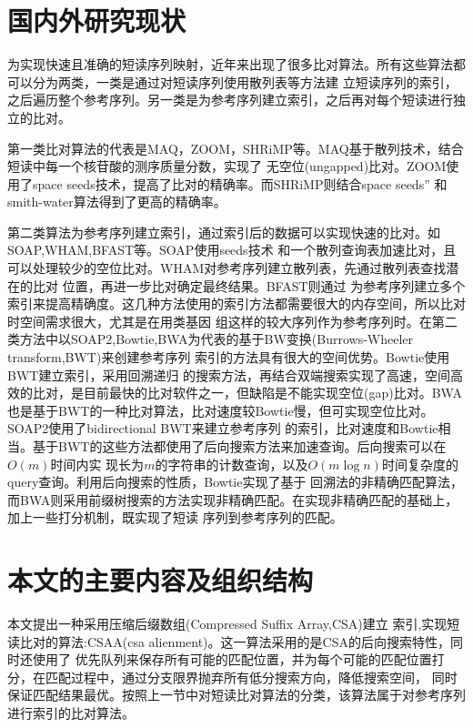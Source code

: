 \section{国内外研究现状}
为实现快速且准确的短读序列映射，近年来出现了很多比对算法。所有这些算法都可以分为两类，一类是通过对短读序列使用散列表等方法建
立短读序列的索引，之后遍历整个参考序列。另一类是为参考序列建立索引，之后再对每个短读进行独立的比对。

第一类比对算法的代表是MAQ，ZOOM，SHRiMP等。MAQ\cite{li2008mapping}基于散列技术，结合短读中每一个核苷酸的测序质量分数，实现了
无空位(ungapped)比对。ZOOM\cite{lin2008zoom}使用了space seeds技术，提高了比对的精确率。而SHRiMP\cite{rumble2009shrimp}则结合space seeds''
和smith-water算法得到了更高的精确率。

第二类算法为参考序列建立索引，通过索引后的数据可以实现快速的比对。如SOAP,WHAM,BFAST等。SOAP\cite{li2008soap}使用seeds技术
和一个散列查询表加速比对，且可以处理较少的空位比对。WHAM\cite{li2012wham}对参考序列建立散列表，先通过散列表查找潜在的比对
位置，再进一步比对确定最终结果。BFAST\cite{homer2009bfast}则通过
为参考序列建立多个索引来提高精确度。这几种方法使用的索引方法都需要很大的内存空间，所以比对时空间需求很大，尤其是在用类基因
组这样的较大序列作为参考序列时。在第二类方法中以SOAP2,Bowtie,BWA为代表的基于BW变换(Burrows-Wheeler transform,BWT)\cite{ferragina2005indexing}来创建参考序列
索引的方法具有很大的空间优势。Bowtie\cite{langmead2009ultrafast}使用BWT建立索引，采用回溯递归
的搜索方法，再结合双端搜索实现了高速，空间高效的比对，是目前最快的比对软件之一，但缺陷是不能实现空位(gap)比对。BWA\cite{li2009fast}
也是基于BWT的一种比对算法，比对速度较Bowtie慢，但可实现空位比对。SOAP2\cite{li2009soap2}使用了bidirectional BWT来建立参考序列
的索引，比对速度和Bowtie相当。基于BWT的这些方法都使用了后向搜索方法\cite{lippert2005space}来加速查询。后向搜索可以在$O(m)$时间内实
现长为$m$的字符串的计数查询，以及$O(m\log n)$时间复杂度的query查询。利用后向搜索的性质，Bowtie实现了基于
回溯法的非精确匹配算法，而BWA则采用前缀树搜索的方法实现非精确匹配。在实现非精确匹配的基础上，加上一些打分机制，既实现了短读
序列到参考序列的匹配。

\section{本文的主要内容及组织结构}

本文提出一种采用压缩后缀数组(Compressed Suffix Array,CSA)建立
索引\cite{grossi2005compressed},实现短读比对的算法:CSAA(csa alienment)。这一算法采用的是CSA的后向搜索特性，同时还使用了
优先队列来保存所有可能的匹配位置，并为每个可能的匹配位置打分，在匹配过程中，通过分支限界抛弃所有低分搜索方向，降低搜索空间，
同时保证匹配结果最优。按照上一节中对短读比对算法的分类，该算法属于对参考序列进行索引的比对算法。

